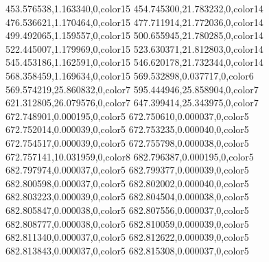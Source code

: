 453.576538,1.163340,0,color15
454.745300,21.783232,0,color14
476.536621,1.170464,0,color15
477.711914,21.772036,0,color14
499.492065,1.159557,0,color15
500.655945,21.780285,0,color14
522.445007,1.179969,0,color15
523.630371,21.812803,0,color14
545.453186,1.162591,0,color15
546.620178,21.732344,0,color14
568.358459,1.169634,0,color15
569.532898,0.037717,0,color6
569.574219,25.860832,0,color7
595.444946,25.858904,0,color7
621.312805,26.079576,0,color7
647.399414,25.343975,0,color7
672.748901,0.000195,0,color5
672.750610,0.000037,0,color5
672.752014,0.000039,0,color5
672.753235,0.000040,0,color5
672.754517,0.000039,0,color5
672.755798,0.000038,0,color5
672.757141,10.031959,0,color8
682.796387,0.000195,0,color5
682.797974,0.000037,0,color5
682.799377,0.000039,0,color5
682.800598,0.000037,0,color5
682.802002,0.000040,0,color5
682.803223,0.000039,0,color5
682.804504,0.000038,0,color5
682.805847,0.000038,0,color5
682.807556,0.000037,0,color5
682.808777,0.000038,0,color5
682.810059,0.000039,0,color5
682.811340,0.000037,0,color5
682.812622,0.000039,0,color5
682.813843,0.000037,0,color5
682.815308,0.000037,0,color5

